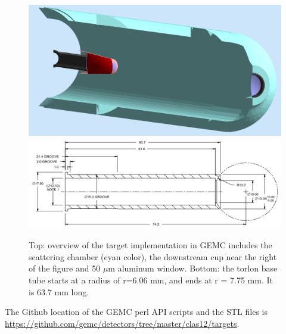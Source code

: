 \begin{figure}
	\centering
	\includegraphics[width=0.99\columnwidth,keepaspectratio]{img/targetOverview1.png}
	\includegraphics[width=0.99\columnwidth,keepaspectratio]{img/targetOverview2.png}
	\caption{Top: overview of the target implementation in GEMC includes the scattering chamber (cyan color), the
            downstream cup near the right of the figure and 50 $\mu$m aluminum window. Bottom: the torlon base
            tube starts at a radius of r=6.06 mm, and ends at r = 7.75 mm. It is 63.7 mm long.}
	\label{fig:targetOverview}
\end{figure}

The Github location of the GEMC perl API scripts and the STL files is \url{https://github.com/gemc/detectors/tree/master/clas12/targets}.





